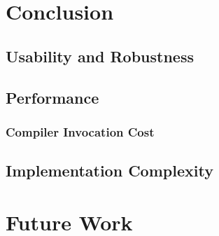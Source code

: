 \chapter{Conclusion}
\section{Usability and Robustness}
\section{Performance}
\subsection{Compiler Invocation Cost}
\section{Implementation Complexity}

\chapter{Future Work}
